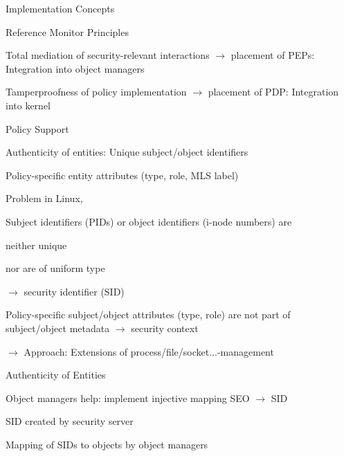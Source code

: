 \documentclass[a4paper]{article}
\begin{document}
\begin{multicols}{3}
    Implementation Concepts
    \begin{itemize*}
        \item Reference Monitor Principles
        \begin{itemize*}
            \item Total mediation of security-relevant interactions $\rightarrow$ placement of PEPs: Integration into object managers
            \item Tamperproofness of policy implementation $\rightarrow$ placement of PDP: Integration into kernel
        \end{itemize*}
        \item Policy Support
        \begin{itemize*}
            \item Authenticity of entities: Unique subject/object identifiers
            \item Policy-specific entity attributes (type, role, MLS label)
        \end{itemize*}
        \item Problem in Linux,
        \begin{itemize*}
            \item Subject identifiers (PIDs) or object identifiers (i-node numbers) are
            \begin{itemize*}
                \item neither unique
                \item nor are of uniform type
            \end{itemize*}
            \item[$\rightarrow$] security identifier (SID)
            \item Policy-specific subject/object attributes (type, role) are not part of subject/object metadata $\rightarrow$ security context
            \item[$\rightarrow$] Approach: Extensions of process/file/socket...-management
        \end{itemize*}
    \end{itemize*}

    Authenticity of Entities
    \begin{itemize*}
        \item Object managers help: implement injective mapping SEO $\rightarrow$ SID
        \begin{itemize*}
            \item SID created by security server
            \item Mapping of SIDs to objects by object managers
        \end{itemize*}
    \end{itemize*}


\end{multicols}
\end{document}
